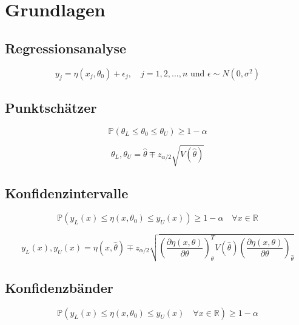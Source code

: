 \chapter{Grundlagen}
\label{chapter:kap2}

\section{Regressionsanalyse}
\begin{equation}
y_j = \eta(x_j, \theta_0) + \epsilon_j, 
\quad j=1,2,...,n \text{ und } \epsilon \sim N(0, \sigma^2)
\end{equation}

\section{Punktschätzer}
\begin{equation}
\mathbb{P} \left( \theta_L \le \theta_0 \le \theta_U \right) \geq 1-\alpha
\end{equation}

\begin{equation}
\theta_L, \theta_U = \hat\theta \mp z_{\alpha/2}
\sqrt{
  V(\hat\theta)
}
\end{equation}

\section{Konfidenzintervalle}
\begin{equation}
\mathbb{P} \left(
  y_L(x) \le \eta(x, \theta_0) \le y_U(x)
\right) \geq 1-\alpha
\quad \forall x \in \mathbb{R}
\end{equation}

\begin{equation}
y_L(x), y_U(x) = \eta(x, \hat\theta) \mp 
z_{\alpha/2} 
\sqrt{
  \left( 
    \frac{\partial\eta(x, \theta)}{\partial\theta} 
  \right)_{\hat\theta}^T 
  V(\hat\theta) 
  \left( 
    \frac{\partial\eta(x, \theta)}{\partial\theta} 
  \right)_{\hat\theta}
}
\end{equation}

\section{Konfidenzbänder}
\begin{equation}
\mathbb{P} \left(
  y_L(x) \le \eta(x, \theta_0) \le y_U(x) 
  \quad \forall x \in \mathbb{R}
\right) \geq 1-\alpha
\end{equation}


